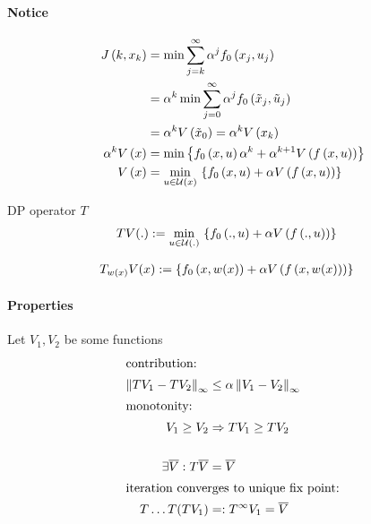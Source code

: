 \paragraph{Notice}
\begin{align*}
J \paren{k,x_k} &= \min \sum_{j=k}^{\infty} \alpha^j f_0 \paren{x_j,u_j}\\
    &= \alpha^k \min \sum_{j=0}^{\infty} \alpha^j f_0 \left( \tilde{x}_j, \tilde{u}_j \right) \\
    &= \alpha^k V \paren{\tilde{x}_0} = \alpha^k V \paren{x_k}\\
\alpha^k V \paren{x}
    &= \min \set { f_0 \paren{x,u} \alpha^k + \alpha^{k+1} V \paren{f \paren{x,u}} }\\
V \paren{x}
    &= \minux{} \set { f_0 \paren{x,u} + \alpha V \paren{f \paren{x,u}} }
\end{align*}

\begin{optExample}{DP operator $T$}
    \begin{align}
        TV(.) &:= \minudot{} \set{ f_0 \paren{.,u} + \alpha V \paren{f \paren{.,u}} }
    \end{align}
    \begin{figure}[H]
        \centering
    \end{figure}
    \begin{align}
        T_{w(x)}V(x) &:= \left\lbrace  f_0 \left( x,w(x) \right) + \alpha V \left( f \left( x,w(x) \right) \right)  \right\rbrace
    \end{align}
\end{optExample}

\paragraph{Properties} Let $V_1, V_2$ be some functions
\begin{align}
\intertext{contribution:}
\norm{TV_1 - TV_2}_\infty &\leq \alpha \norm{V_1 - V_2}_\infty\\
%
\intertext{monotonity:}
V_1 \geq V_2 &\Rightarrow TV_1 \geq TV_2\\
%
\nonumber \\
\exists \Vbar{}: T\Vbar{} &= \Vbar{}\\
%
\intertext{iteration converges to unique fix point:}
T \dots T(TV_1) &=: T^\infty V_1 = \Vbar{}
\end{align}

